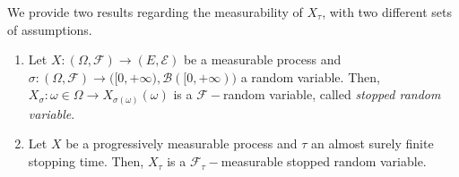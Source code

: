 \begin{proposition}
    We provide two results regarding the measurability of $X_{\tau}$, with two different sets of assumptions.
    \begin{enumerate}
        \item Let $X : (\Omega, \mathcal{F}) \to (E,\mathcal{E})$ be a measurable process and $\sigma : (\Omega,\mathcal{F}) \to \big([0,+\infty), \mathcal{B}([0,+\infty)\big)$ a random variable. Then, $X_{\sigma} : \omega \in \Omega \to X_{\sigma(\omega)}(\omega)$ is a $\mathcal{F}-$random variable, called \textit{stopped random variable}.
        \item Let $X$ be a progressively measurable process and $\tau$ an almost surely finite stopping time. Then, $X_{\tau}$ is a $\mathcal{F}_{\tau}-$measurable stopped random variable. 
    \end{enumerate}
\end{proposition}
